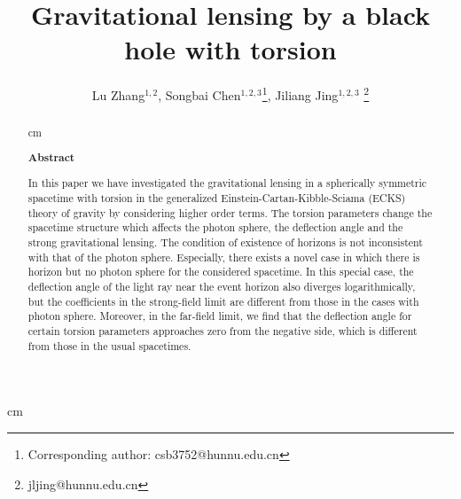 \documentclass[aps,showpacs,preprintnumbers,amsmath,amssymb]{revtex4}
\begin{document}
 cm
\title{{\bf Gravitational lensing by a black hole with torsion }}

\author{Lu Zhang$^{1,2}$, Songbai Chen$^{1,2,3}$\footnote{Corresponding author: csb3752@hunnu.edu.cn}, Jiliang
Jing$^{1,2,3}$ \footnote{jljing@hunnu.edu.cn}}






\vspace*{0.2cm}
\begin{abstract}
 cm
\begin{center}
{\bf Abstract}
\end{center}

In this paper we have investigated the gravitational lensing in a spherically symmetric spacetime with torsion in the generalized Einstein-Cartan-Kibble-Sciama (ECKS) theory of gravity by considering higher order terms. The torsion parameters change the spacetime structure which affects the photon sphere, the deflection angle and the strong gravitational
lensing. The condition of existence of horizons is not inconsistent with that of the photon sphere. Especially,
there exists a novel case in which there is horizon but no photon sphere for the considered spacetime. In this special case, the deflection angle of the light ray near the event horizon also diverges logarithmically, but the coefficients in the strong-field limit are different from those in the cases with photon sphere. Moreover, in the far-field limit, we find that the deflection angle for certain torsion parameters approaches zero from the negative side, which is different from those in the usual spacetimes.
\end{abstract}


 \maketitle
\newpage
\vspace*{0.2cm}
\end{document}
